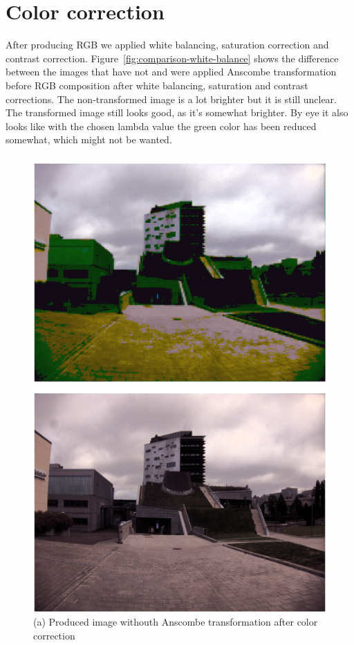 \documentclass[12pt,a4paper,english
]{tunithesis}
\begin{document}
\section{Color correction}
After producing RGB we applied white balancing, saturation correction and contrast correction. Figure~\ref{fig:comparison-white-balance} shows the difference between the images that have not and were applied Anscombe transformation before RGB composition after white balancing, saturation and contrast corrections. The non-transformed image is a lot brighter but it is still unclear. The transformed image still looks good, as it's somewhat brighter. By eye it also looks like with the chosen lambda value the green color has been reduced somewhat, which might not be wanted.

\begin{figure}[h]
  \centering
  \begin{minipage}[b]{0.45\textwidth}
    \includegraphics[width=\textwidth]{img/non-transformed-white-balance.png}
    \caption*{(a) Produced image withouth Anscombe transformation after color correction}
  \end{minipage}
  \hfill
  \begin{minipage}[b]{0.45\textwidth}
    \includegraphics[width=\textwidth]{img/transformed-white-balance.png}

\end{minipage}
\end{figure}
\end{document}
